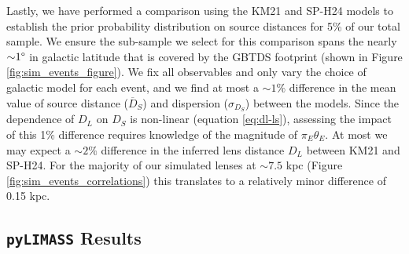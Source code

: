 \documentclass[twocolumn]{aastex631}
\begin{document}
\indent Lastly, we have performed a comparison using the KM21 and SP-H24 models to establish the prior probability distribution on source distances for 5\% of our total sample. We ensure the sub-sample we select for this comparison spans the nearly ${\sim}1\degree$ in galactic latitude that is covered by the GBTDS footprint (shown in Figure \ref{fig:sim_events_figure}). We fix all observables and only vary the choice of galactic model for each event, and we find at most a ${\sim}1\%$ difference in the mean value of source distance ($\overline D_S$) and dispersion ($\sigma_{D_S}$) between the models. Since the dependence of $D_L$ on $D_S$ is non-linear (equation \ref{eq:dl-ls}), assessing the impact of this 1\% difference requires knowledge of the magnitude of $\pi_E \theta_E$. At most we may expect a ${\sim}2\%$ difference in the inferred lens distance $D_L$ between KM21 and SP-H24. For the majority of our simulated lenses at ${\sim}7.5$ kpc (Figure \ref{fig:sim_events_correlations}) this translates to a relatively minor difference of 0.15 kpc.

\subsection{\texttt{pyLIMASS} Results}\label{subsec:pylimass_results}
\end{document}
